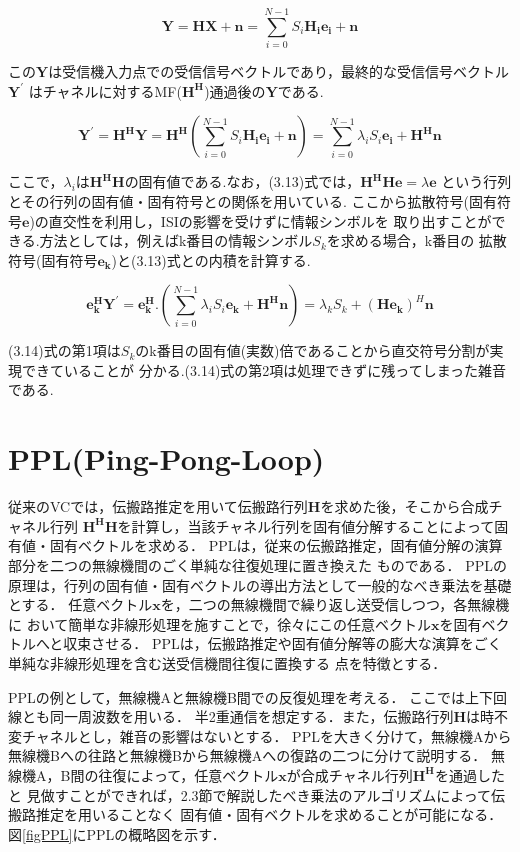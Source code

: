 \begin{equation}
    \bm{Y} = \bm{HX}+\bm{n} = \sum_{i=0}^{N-1} S_i\bm{H_ie_i}+\bm{n}
\end{equation}

この$\bm{Y}$は受信機入力点での受信信号ベクトルであり，最終的な受信信号ベクトル$\bm{Y^{\prime}}$
はチャネルに対するMF($\bm{H^H}$)通過後の$\bm{Y}$である.

\begin{equation}
    \bm{Y^{\prime}}=\bm{H^HY}=\bm{H^H}
    \left(
        \sum_{i=0}^{N-1} S_i\bm{H_ie_i}+\bm{n}
    \right)
    =\sum_{i=0}^{N-1} \lambda_iS_i\bm{e_i}+\bm{H^Hn}
\end{equation}

ここで，$\lambda_i$は$\bm{H^HH}$の固有値である.なお，(3.13)式では，$\bm{H^HHe}=\lambda\bm{e}$
という行列とその行列の固有値・固有符号との関係を用いている.
ここから拡散符号(固有符号$\bm{e}$)の直交性を利用し，ISIの影響を受けずに情報シンボルを
取り出すことができる.方法としては，例えばk番目の情報シンボル$S_k$を求める場合，k番目の
拡散符号(固有符号$\bm{e_k}$)と(3.13)式との内積を計算する.

\begin{equation}
    \bm{e_k^HY^{\prime}}=\bm{e_k^H}.
    \left(
        \sum_{i=0}^{N-1} \lambda_iS_i\bm{e_k}+\bm{H^Hn}
    \right)
    =\lambda_kS_k+(\bm{He_k})^H\bm{n}
\end{equation}

(3.14)式の第1項は$S_k$のk番目の固有値(実数)倍であることから直交符号分割が実現できていることが
分かる.(3.14)式の第2項は処理できずに残ってしまった雑音である.

\section{PPL(Ping-Pong-Loop)}
従来のVCでは，伝搬路推定を用いて伝搬路行列$\bm{H}$を求めた後，そこから合成チャネル行列
$\bm{H^HH}$を計算し，当該チャネル行列を固有値分解することによって固有値・固有ベクトルを求める．
PPLは，従来の伝搬路推定，固有値分解の演算部分を二つの無線機間のごく単純な往復処理に置き換えた
ものである．
PPLの原理は，行列の固有値・固有ベクトルの導出方法として一般的なべき乗法を基礎とする．
任意ベクトル$\bm{x}$を，二つの無線機間で繰り返し送受信しつつ，各無線機に
おいて簡単な非線形処理を施すことで，徐々にこの任意ベクトル$\bm{x}$を固有ベクトルへと収束させる．
PPLは，伝搬路推定や固有値分解等の膨大な演算をごく単純な非線形処理を含む送受信機間往復に置換する
点を特徴とする．

PPLの例として，無線機Aと無線機B間での反復処理を考える．
ここでは上下回線とも同一周波数を用いる．
半2重通信を想定する．また，伝搬路行列$\bm{H}$は時不変チャネルとし，雑音の影響はないとする．
PPLを大きく分けて，無線機Aから無線機Bへの往路と無線機Bから無線機Aへの復路の二つに分けて説明する．
無線機A，B間の往復によって，任意ベクトル$\bm{x}$が合成チャネル行列$\bm{H^H}$を通過したと
見做すことができれば，2.3節で解説したべき乗法のアルゴリズムによって伝搬路推定を用いることなく
固有値・固有ベクトルを求めることが可能になる．
図\ref{figPPL}にPPLの概略図を示す．

